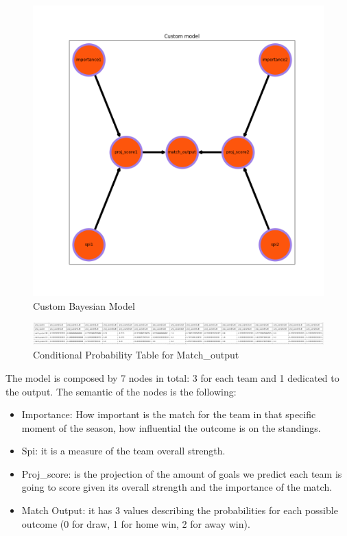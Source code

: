 \documentclass[letterpaper]{article}
\begin{document}
%
\begin{figure}
    \centering
    \includegraphics[scale=0.4]{images/bayesian_model.png}
    \caption{Custom Bayesian Model }
    \label{fig:network}
\end{figure}

\begin{figure}[t]
    \centering
    \includegraphics[scale=0.35]{images/Cpt.png}
    \caption{Conditional Probability Table for Match\_output }
    \label{fig:network}
\end{figure}


The model is composed by 7 nodes in total: 3 for each team and 1 dedicated to the output. The semantic of the nodes is the following:
\begin{itemize}
    \item Importance: How important is the match for the team in that specific moment of the season, how influential the outcome is on the standings.
    \item Spi: it is a measure of the team overall strength.
    \item Proj\_score: is the projection of the amount of goals we predict each team is going to score given its overall strength and the importance of the match.
    \item Match Output: it has 3 values describing the probabilities for each possible outcome (0 for draw, 1 for home win, 2 for away win).

\end{itemize}
\end{document}
